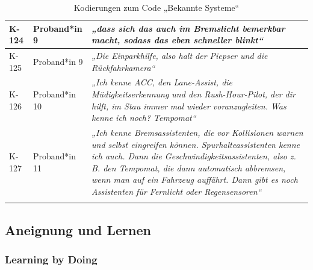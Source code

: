 {\begin{xltabular}{\textwidth}{
    |P{0.10\textwidth}
    |P{0.17\textwidth}
    |Y|
}
\hline
K-124 & Proband*in 9 & \textit{„dass sich das auch im Bremslicht bemerkbar macht, sodass das eben schneller blinkt“} \\
\hline
K-125 & Proband*in 9 & \textit{„Die Einparkhilfe, also halt der Piepser und die Rückfahrkamera“} \\
\hline
K-126 & Proband*in 10 & \textit{„Ich kenne ACC, den Lane-Assist, die Müdigkeitserkennung und den Rush-Hour-Pilot, der dir hilft, im Stau immer mal wieder voranzugleiten. Was kenne ich noch? Tempomat“} \\
\hline
K-127 & Proband*in 11 & \textit{„Ich kenne Bremsassistenten, die vor Kollisionen warnen und selbst eingreifen können. Spurhalteassistenten kenne ich auch. Dann die Geschwindigkeitsassistenten, also z. B. den Tempomat, die dann automatisch abbremsen, wenn man auf ein Fahrzeug auffährt. Dann gibt es noch Assistenten für Fernlicht oder Regensensoren“} \\
\hline
\caption{Kodierungen zum Code „Bekannte Systeme“}\label{tab:kodiernachweis-bekannte-systeme}\\
\end{xltabular}
}

\clearpage
\subsection{Aneignung und Lernen}
\label{subsec:kodiernachweis-aneignung-und-lernen}

\subsubsection{Learning by Doing}

